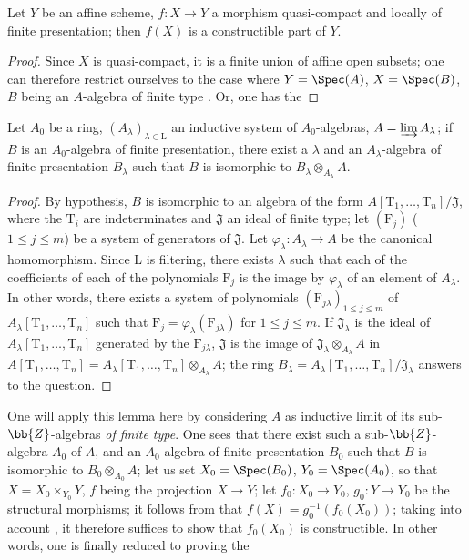 \begin{lemma}[1.8.4.1]
\label{IV.1.8.4.1}
Let $Y$ be an affine scheme, $f:X\to Y$ a morphism quasi-compact and locally of finite presentation; then $f(X)$ is a constructible part of $Y$.
\end{lemma}

\begin{proof}
Since $X$ is quasi-compact, it is a finite union of affine open subsets; one can therefore restrict ourselves to the case where $Y=\Spec(A)$, $X=\Spec(B)$, $B$ being an $A$-algebra of finite type .
Or, one has the
\end{proof}

\begin{lemma}[1.8.4.2]
\label{IV.1.8.4.2}
Let $A_0$ be a ring, $(A_\lambda)_{\lambda\in\mathrm{L}}$ an inductive system of $A_0$-algebras, $A=\varinjlim A_\lambda$; if $B$ is an $A_0$-algebra of finite presentation, there exist a $\lambda$ and an $A_\lambda$-algebra of finite presentation $B_\lambda$ such that $B$ is isomorphic to $B_\lambda\otimes_{A_\lambda} A$.
\end{lemma}

\begin{proof}
By hypothesis, $B$ is isomorphic to an algebra of the form $A[\mathrm{T}_1,\ldots,\mathrm{T}_n]/\mathfrak{J}$, where the $\mathrm{T}_i$ are indeterminates and $\mathfrak{J}$ an ideal of finite type; let $(\mathrm{F}_j)$ ($1\leq j\leq m$) be a system of generators of $\mathfrak{J}$.
Let $\varphi_\lambda:A_\lambda\to A$ be the canonical homomorphism.
Since $\mathrm{L}$ is filtering, there exists $\lambda$ such that each of the coefficients of each of the polynomials $\mathrm{F}_j$ is the image by $\varphi_\lambda$ of an element of $A_\lambda$.
In other words, there exists a system of polynomials $(\mathrm{F}_{j\lambda})_{1\leq j\leq m}$ of $A_\lambda[\mathrm{T}_1,\ldots,\mathrm{T}_n]$ such that $\mathrm{F}_j=\varphi_\lambda(\mathrm{F}_{j\lambda})$ for $1\leq j\leq m$.
If $\mathfrak{J}_\lambda$ is the ideal of $A_\lambda[\mathrm{T}_1,\ldots,\mathrm{T}_n]$ generated by the $\mathrm{F}_{j\lambda}$, $\mathfrak{J}$ is the image of $\mathfrak{J}_\lambda\otimes_{A_\lambda} A$ in $A[\mathrm{T}_1,\ldots,\mathrm{T}_n]=A_\lambda[\mathrm{T}_1,\ldots,\mathrm{T}_n]\otimes_{A_\lambda} A$; the ring $B_\lambda=A_\lambda[\mathrm{T}_1,\ldots,\mathrm{T}_n]/\mathfrak{J}_\lambda$ answers to the question.
\end{proof}

One will apply this lemma here by considering $A$ as inductive limit of its sub-$\bb{Z}$-algebras \emph{of finite type}.
One sees that there exist such a sub-$\bb{Z}$-algebra $A_0$ of $A$, and an $A_0$-algebra of finite presentation $B_0$ such that $B$ is isomorphic to $B_0\otimes_{A_0} A$; let us set $X_0=\Spec(B_0)$, $Y_0=\Spec(A_0)$, so that $X=X_0\times_{Y_0} Y$, $f$ being the projection $X\to Y$; let $f_0:X_0\to Y_0$, $g_0:Y\to Y_0$ be the structural morphisms; it follows from  that $f(X)=g_0^{-1}(f_0(X_0))$; taking into account , it therefore suffices to show that $f_0(X_0)$ is constructible.
In other words, one is finally reduced to proving the

